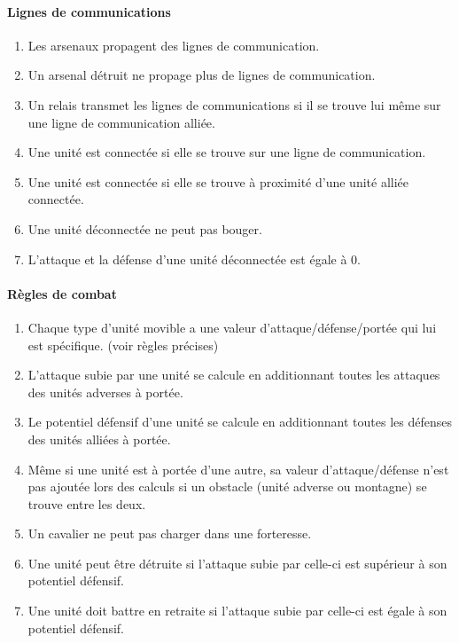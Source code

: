 		\paragraph{Lignes de communications}
		\begin{enumerate}
		\item Les arsenaux propagent des lignes de communication.
		\item Un arsenal détruit ne propage plus de lignes de communication.
		\item Un relais transmet les lignes de communications si il se trouve lui même sur une ligne de communication alliée.
		\item Une unité est connectée si elle se trouve sur une ligne de communication.
		\item Une unité est connectée si elle se trouve à proximité d'une unité alliée connectée.
		\item Une unité déconnectée ne peut pas bouger.
		\item L'attaque et la défense d'une unité déconnectée est égale à 0.
		\end{enumerate}
		
		\paragraph{Règles de combat}
		\begin{enumerate}
		\item Chaque type d'unité movible a une valeur d'attaque/défense/portée qui lui est spécifique. (voir règles précises)
		\item L'attaque subie par une unité se calcule en additionnant toutes les attaques des unités adverses à portée.
		\item Le potentiel défensif d'une unité se calcule en additionnant toutes les défenses des unités alliées à portée.
		\item Même si une unité est à portée d'une autre, sa valeur d'attaque/défense n'est pas ajoutée lors des calculs si un obstacle (unité adverse ou montagne) se trouve entre les deux.
		\item Un cavalier ne peut pas charger dans une forteresse.
		\item Une unité peut être détruite si l'attaque subie par celle-ci est supérieur à son potentiel défensif.
		\item Une unité doit battre en retraite si l'attaque subie par celle-ci est égale à son potentiel défensif.
		\end{enumerate}
		
